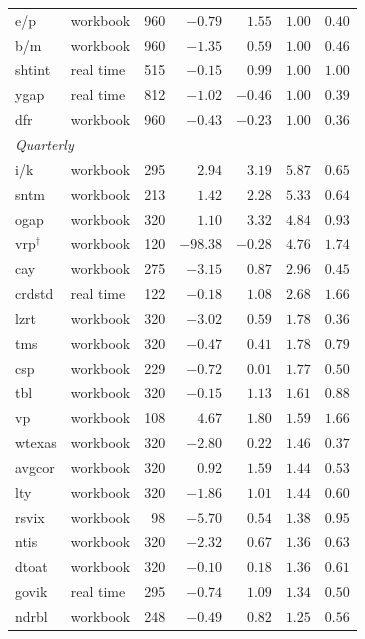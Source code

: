 \begin{tabular}{llrrrrr}
    e/p & workbook & 960 & $-0.79$ & $1.55$ & $1.00$ & $0.40$ \\
    b/m & workbook & 960 & $-1.35$ & $0.59$ & $1.00$ & $0.46$ \\
    shtint & real time & 515 & $-0.15$ & $0.99$ & $1.00$ & $1.00$ \\
    ygap & real time & 812 & $-1.02$ & $-0.46$ & $1.00$ & $0.39$ \\
    dfr & workbook & 960 & $-0.43$ & $-0.23$ & $1.00$ & $0.36$ \\
    \midrule
    \multicolumn{7}{l}{\emph{Quarterly}} \\
    i/k & workbook & 295 & $2.94$ & $3.19$ & $5.87$ & $0.65$ \\
    sntm & workbook & 213 & $1.42$ & $2.28$ & $5.33$ & $0.64$ \\
    ogap & workbook & 320 & $1.10$ & $3.32$ & $4.84$ & $0.93$ \\
    vrp$^\dagger$ & workbook & 120 & $-98.38$ & $-0.28$ & $4.76$ & $1.74$ \\
    cay & workbook & 275 & $-3.15$ & $0.87$ & $2.96$ & $0.45$ \\
    crdstd & real time & 122 & $-0.18$ & $1.08$ & $2.68$ & $1.66$ \\
    lzrt & workbook & 320 & $-3.02$ & $0.59$ & $1.78$ & $0.36$ \\
    tms & workbook & 320 & $-0.47$ & $0.41$ & $1.78$ & $0.79$ \\
    csp & workbook & 229 & $-0.72$ & $0.01$ & $1.77$ & $0.50$ \\
    tbl & workbook & 320 & $-0.15$ & $1.13$ & $1.61$ & $0.88$ \\
    vp & workbook & 108 & $4.67$ & $1.80$ & $1.59$ & $1.66$ \\
    wtexas & workbook & 320 & $-2.80$ & $0.22$ & $1.46$ & $0.37$ \\
    avgcor & workbook & 320 & $0.92$ & $1.59$ & $1.44$ & $0.53$ \\
    lty & workbook & 320 & $-1.86$ & $1.01$ & $1.44$ & $0.60$ \\
    rsvix & workbook & 98 & $-5.70$ & $0.54$ & $1.38$ & $0.95$ \\
    ntis & workbook & 320 & $-2.32$ & $0.67$ & $1.36$ & $0.63$ \\
    dtoat & workbook & 320 & $-0.10$ & $0.18$ & $1.36$ & $0.61$ \\
    govik & real time & 295 & $-0.74$ & $1.09$ & $1.34$ & $0.50$ \\
    ndrbl & workbook & 248 & $-0.49$ & $0.82$ & $1.25$ & $0.56$ \\

\end{tabular}
